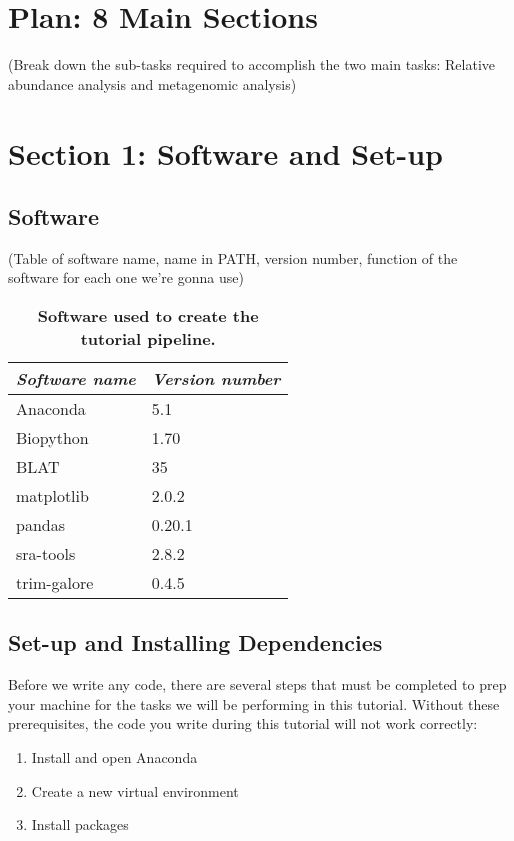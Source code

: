 
\chapter{Plan: 8 Main Sections}
(Break down the sub-tasks required to accomplish the two main tasks: Relative abundance analysis and metagenomic analysis)

\chapter{Section 1: Software and Set-up}
\section{Software}
(Table of software name, name in PATH, version number, function of the software for each one we're gonna use)
%
\begin{table}[htp]
    \begin{center}
    \begin{tabular}{ l | l }
        \textit{Software name} & \textit{Version number} \\ 
        \hline
        Anaconda & 5.1 \\  
        Biopython & 1.70 \\
        BLAT & 35 \\
        matplotlib & 2.0.2 \\
        pandas & 0.20.1 \\
        sra-tools & 2.8.2 \\
        trim-galore & 0.4.5 \\
    \end{tabular}
    \caption{\textbf{Software used to create the tutorial pipeline.}}
    \label{tab:software}
    \end{center}
    \label{software}
\end{table}
%
\section{Set-up and Installing Dependencies}
Before we write any code, there are several steps that must be completed to prep your machine for the tasks we will be performing in this tutorial. Without these prerequisites, the code you write during this tutorial will not work correctly:
\begin{enumerate}
\item Install and open Anaconda
\item Create a new virtual environment
\item Install packages
\end{enumerate}

